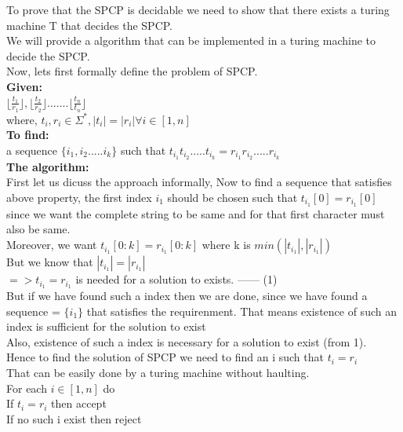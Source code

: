 \documentclass{article}
\begin{document}
To prove that the SPCP is decidable we need to show that there exists a turing machine T that decides the SPCP.\\
We will provide a algorithm that can be implemented in a turing machine to decide the SPCP.\\

Now, lets first formally define the problem of SPCP.\\

\textbf{Given: }\\

$\lfloor \frac{t_1}{r_1} \rfloor , \lfloor \frac{t_2}{r_2} \rfloor ....... \lfloor \frac{t_n}{t_n} \rfloor$ \\
where, $t_i , r_i \in \Sigma^* , |t_i| = |r_i| \forall i \in [1,n]$\\

\textbf{To find: } \\
a sequence $\{ i_1,i_2.....i_k \}$ such that $t_{i_1}t_{i_2}.....t_{i_k} = r_{i_1}r_{i_2}.....r_{i_k}$\\

\textbf{The algorithm: }\\

First let us dicuss the approach informally, Now to find a sequence that satisfies above property, the first index $i_1$ should be chosen such that $t_{i_1}[0] = r_{i_1}[0]$ since we want the complete string to be same 
and for that first character must also be same.\\
Moreover, we want $t_{i_1}[0:k] = r_{i_1}[0:k]$ where k is $min(|t_{i_1}|,|r_{i_1}|)$\\
But we know that $|t_{i_1}| = |r_{i_1}|$\\
$ => t_{i_1} = r_{i_1}$ is needed for a solution to exists. ------ (1)\\
But if we have found such a index then we are done, since we have found a sequence = $\{i_1\}$  that satisfies the requirenment. That means existence of such an index is sufficient for the solution to exist\\
Also, existence of such a index is necessary for a solution to exist (from 1).\\
Hence to find the solution of SPCP we need to find an i such that $t_i = r_i$\\ That can be easily done by a turing machine without haulting.\\

For each $i \in [1,n]$ do\\
\hspace*{2cm} If $t_i = r_i$ then accept\\
\hspace*{0.5cm} If no such i exist then reject\\

\pagebreak
\end{document}
